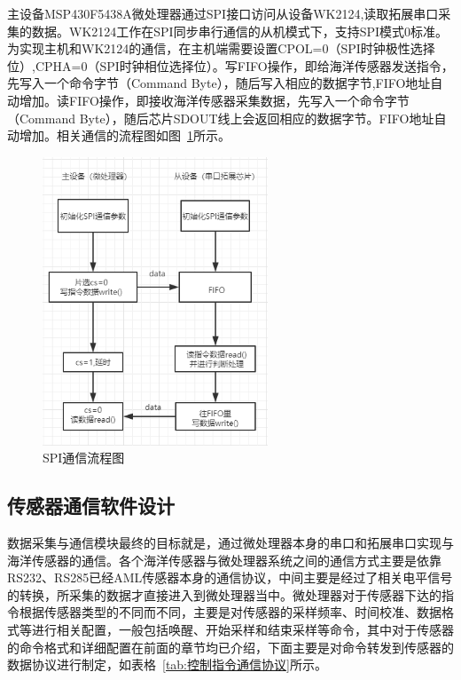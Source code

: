 主设备MSP430F5438A微处理器通过SPI接口访问从设备WK2124,读取拓展串口采集的数据。WK2124工作在SPI同步串行通信的从机模式下，支持SPI模式0标准。为实现主机和WK2124的通信，在主机端需要设置CPOL=0（SPI时钟极性选择位）,CPHA=0（SPI时钟相位选择位）。写FIFO操作，即给海洋传感器发送指令，先写入一个命令字节（Command Byte），随后写入相应的数据字节,FIFO地址自动增加。读FIFO操作，即接收海洋传感器采集数据，先写入一个命令字节（Command Byte），随后芯片SDOUT线上会返回相应的数据字节。FIFO地址自动增加。相关通信的流程图如图~\ref{fig:SPI通信流程图}所示。
\begin{figure}[ht]
    \centering
	\includegraphics[width=0.6\textwidth]{fig/SPI通信流程图.png}
	\caption{SPI通信流程图}
	\label{fig:SPI通信流程图}
\end{figure}

\subsection{传感器通信软件设计}
数据采集与通信模块最终的目标就是，通过微处理器本身的串口和拓展串口实现与海洋传感器的通信。各个海洋传感器与微处理器系统之间的通信方式主要是依靠RS232、RS285已经AML传感器本身的通信协议，中间主要是经过了相关电平信号的转换，所采集的数据才直接进入到微处理器当中。微处理器对于传感器下达的指令根据传感器类型的不同而不同，主要是对传感器的采样频率、时间校准、数据格式等进行相关配置，一般包括唤醒、开始采样和结束采样等命令，其中对于传感器的命令格式和详细配置在前面的章节均已介绍，下面主要是对命令转发到传感器的数据协议进行制定，如表格~\ref{tab:控制指令通信协议}所示。

